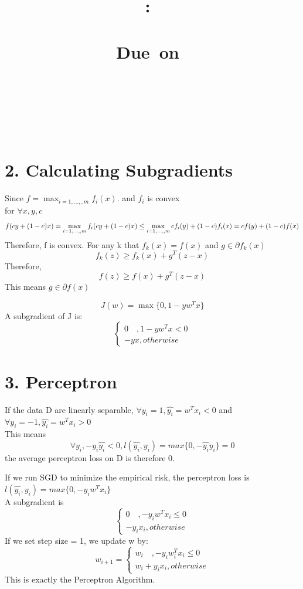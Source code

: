 \documentclass{article}
\title{
    \vspace{2in}
    \textmd{\textbf{\hmwkClass:\ \hmwkTitle \\ \hmwksubtitle }}\\
    \vspace{1in}
    \normalsize\vspace{0.1in}\small{Due\ on\ \hmwkDueDate}\\
    \vspace{0.1in}\large{\textit{\hmwkClassInstructor}}\\
    \vspace{3in}
    \author{\textbf{\hmwkAuthorName} \\ \textbf{\hmwknetid }\\ }
    \vspace{0.2in}
    \gihub
}
\date{}
\newenvironment{problem}[2][$\bullet$]{\begin{trivlist}\large
		\item[\hskip \labelsep {\bfseries #1}\hskip \labelsep {\bfseries #2.}]}  {\end{trivlist}}
\newenvironment{sub}[2][$-$]{\begin{trivlist}
		\item[\hskip \labelsep {\bfseries #1}\hskip \labelsep {\bfseries #2.}]}  {\end{trivlist}}
\begin{document}
\maketitle

\pagebreak

\section{2. Calculating  Subgradients}

\begin{problem}{2.1 Subgradients for pointwise maximum of functions}
\end{problem}
Since $f = \max_{i=1,\ldots,,m}f_{i}(x)$. and $f_i $ is convex\\
for $\forall x,y,c$$$f(cy+(1-c)x) = \max_{i=1,\ldots,,m}f_{i}(cy+(1-c)x) \leq \max_{i=1,\ldots,,m} cf_i(y) + (1-c)f_i(x)\\ = cf(y) + (1-c)f(x)$$
Therefore, f is convex.  For any k that $f_k(x) = f(x)$ and $g \in \partial f_k(x) $
$$f_k(z) \geq f_k(x) + g^T (z-x)$$ Therefore, $$f(z) \geq f(x) + g^T(z-x)$$
This means $g \in \partial f(x)$

\begin{problem}{2.2 Subgradient of hinge loss for linear prediction}
\end{problem}
$$J(w) = \max \{0,1-yw^Tx\}$$
A subgradient of J is:\\
$$\begin{cases}
0 \quad , 1 -yw^Tx <0\\
-yx, otherwise
\end{cases}$$

\section{3. Perceptron}
\begin{sub}{3.1}
\end{sub}
If the data D are linearly separable, $\forall y_i = 1, \hat{y_i}= w^Tx_i <0 $ and $\forall y_i =-1, \hat{y_i} = w^Tx_i >0$ \\
This means $$\forall y_i, -y_i\hat{y_i} <0, l(\hat{y_i},y_i) = max\{0,-\hat{y_i}y_i\} = 0$$
the average perceptron loss on D is therefore 0. 

\begin{sub}{3.2}
\end{sub}
If we run SGD to minimize the empirical risk, the perceptron loss is  $ l(\hat{y_i},y_i) = max\{0,-y_iw^Tx_i\}$\\
A subgradient is $$\begin{cases}
0 \quad , -y_iw^Tx_i \leq 0\\
-y_ix_i, otherwise
\end{cases}$$
If we set step size = 1, we update w by:
$$w_{i+1} = \begin{cases}
w_i \quad , -y_iw_i^Tx_i \leq 0\\
w_i+y_ix_i, otherwise
\end{cases}$$
This is exactly the Perceptron Algorithm. 
\pagebreak
\end{document}
